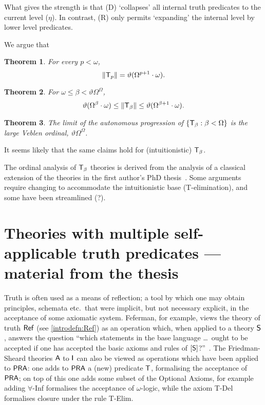 \documentclass[UKenglish,cleveref,DIV=12]{scrartcl}
\newtheorem{theorem}{Theorem}[section]
\theoremstyle{definition}
\theoremstyle{definition}
\begin{document}
What gives the strength is that (D) `collapses' all internal truth predicates to the current level (\( \eta \)).
In contrast, (R) only permits `expanding' the internal level by lower level predicates.


We argue that
%
\begin{theorem}
	For every \( p < \omega \),
\[
  \lVert{\mathsf{T}_p}\rVert = \vartheta ( \Omega ^{p+1} \cdot \omega ).
\]
\end{theorem}

\begin{theorem}
	For \( \omega \le \beta < \vartheta \Omega^\Omega \),
\[
	\vartheta(\Omega^\beta \cdot \omega) \le \lVert{\mathsf{T}_\beta}\rVert \le \vartheta ( \Omega ^{\beta+1} \cdot \omega ).
\]
\end{theorem}

\begin{theorem}
	The limit of the autonomous progression of \( \{ \mathsf{T}_\beta : \beta < \Omega \} \) is the large Veblen ordinal, \( \vartheta \Omega^\Omega \).
\end{theorem}

It seems likely that the same claims hold for (intuitionistic) \( \mathsf{T}_\beta \).

The ordinal analysis of \( \mathsf{T}_\beta \) theories is derived from the analysis of a classical extension of the theories in the first author's PhD thesis~\cite{Lei-thesis}.
Some arguments require changing to accommodate the intuitionistic base (T-elimination), and some have been streamlined (?).

\section{Theories with multiple self-applicable truth predicates --- material from the thesis}
\label{chap:ext}

\fussy Truth is often used as a means of reflection; a tool by which one may obtain
principles, schemata etc.~that were implicit, but not necessary explicit, in the
acceptance of some axiomatic system. Feferman, for example, views the theory
of truth $\mathsf{Ref}$ (see \cref{introdefn:Ref}) as an operation which, when applied
to a theory $\mathsf{S}$, answers the question ``which statements in the base
language \dots{}\ {ought} to be accepted {if} one has accepted the basic axioms and
rules of $[\mathsf{S}]$?''~\cite[p.~2]{Fef91}.
The Friedman-Sheard theories $\mathsf{A}$ to $\mathsf{I}$ can also be viewed as operations which
have been applied to $\mathsf{PRA}$: one adds to $\mathsf{PRA}$ a (new) predicate $\mathsf{T}$,
formalising the acceptance of $\mathsf{PRA}$; on top of this one adds some subset of the Optional
Axioms, for example adding $\forall$-Inf formalises the acceptance of
$\omega$-logic, while the axiom T-Del formalises closure under the rule T-Elim.
\end{document}
